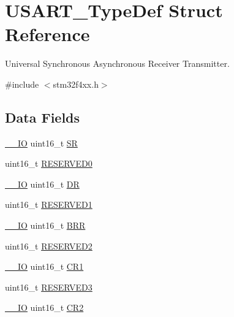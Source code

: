 \hypertarget{struct_u_s_a_r_t___type_def}{\section{U\-S\-A\-R\-T\-\_\-\-Type\-Def Struct Reference}
\label{struct_u_s_a_r_t___type_def}
}


Universal Synchronous Asynchronous Receiver Transmitter.  




{\ttfamily \#include $<$stm32f4xx.\-h$>$}

\subsection*{Data Fields}
\begin{DoxyCompactItemize}
\item 
\hyperlink{group___c_m_s_i_s__core__definitions_gaec43007d9998a0a0e01faede4133d6be}{\-\_\-\-\_\-\-I\-O} uint16\-\_\-t \hyperlink{struct_u_s_a_r_t___type_def_a44962ea5442d203bf4954035d1bfeb9d}{S\-R}
\item 
uint16\-\_\-t \hyperlink{struct_u_s_a_r_t___type_def_a149feba01f9c4a49570c6d88619f504f}{R\-E\-S\-E\-R\-V\-E\-D0}
\item 
\hyperlink{group___c_m_s_i_s__core__definitions_gaec43007d9998a0a0e01faede4133d6be}{\-\_\-\-\_\-\-I\-O} uint16\-\_\-t \hyperlink{struct_u_s_a_r_t___type_def_a0a1acc0425516ff7969709d118b96a3b}{D\-R}
\item 
uint16\-\_\-t \hyperlink{struct_u_s_a_r_t___type_def_a8249a3955aace28d92109b391311eb30}{R\-E\-S\-E\-R\-V\-E\-D1}
\item 
\hyperlink{group___c_m_s_i_s__core__definitions_gaec43007d9998a0a0e01faede4133d6be}{\-\_\-\-\_\-\-I\-O} uint16\-\_\-t \hyperlink{struct_u_s_a_r_t___type_def_af0ba3d82d524fddbe0fb3309788e2954}{B\-R\-R}
\item 
uint16\-\_\-t \hyperlink{struct_u_s_a_r_t___type_def_a5573848497a716a9947fd87487709feb}{R\-E\-S\-E\-R\-V\-E\-D2}
\item 
\hyperlink{group___c_m_s_i_s__core__definitions_gaec43007d9998a0a0e01faede4133d6be}{\-\_\-\-\_\-\-I\-O} uint16\-\_\-t \hyperlink{struct_u_s_a_r_t___type_def_a61400ce239355b62aa25c95fcc18a5e1}{C\-R1}
\item 
uint16\-\_\-t \hyperlink{struct_u_s_a_r_t___type_def_a6c3b31022e6f59b800e9f5cc2a89d54c}{R\-E\-S\-E\-R\-V\-E\-D3}
\item 
\hyperlink{group___c_m_s_i_s__core__definitions_gaec43007d9998a0a0e01faede4133d6be}{\-\_\-\-\_\-\-I\-O} uint16\-\_\-t \hyperlink{struct_u_s_a_r_t___type_def_a2a3e81bd118d1bc52d24a0b0772e6a0c}{C\-R2}

\end{DoxyCompactItemize}
